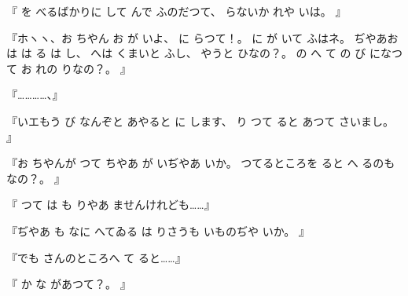 『
を
べるばかりに
して
んで
ふのだつて、
らないか
れや
いは。
』

『ホヽヽ、お
ちやん
お
が
いよ、
に
らつて！。
に
が
いて
ふはネ。
ぢやあお
は
は
る
は
し、
へは
くまいと
ふし、
やうと
ひなの？。
の
へ
て
の
び
になつて
お
れの
りなの？。
』

『…………、』

『いエもう
び
なんぞと
あやると
に
します、
り
つて
ると
あつて
さいまし。
』

『お
ちやんが
つて
ちやあ
が
いぢやあ
いか。
つてるところを
ると
へ
るのも
なの？。
』

『
つて
は
も
りやあ
ませんけれども……』

『ぢやあ
も
なに
へてゐる
は
りさうも
いものぢや
いか。
』

『でも
さんのところへ
て
ると……』

『
か
な
があつて？。
』

